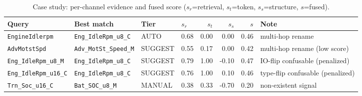 \begin{table}[t]
\caption{Case study: per-channel evidence and fused score ($s_r$=retrieval, $s_t$=token, $s_s$=structure, $s$=fused).}
\label{tab:casestudy}
\centering
\footnotesize
\setlength{\tabcolsep}{3.5pt}
\begin{tabular}{llllrrrl}
\toprule
Query & Best match & Tier & $s_r$ & $s_t$ & $s_s$ & $s$ & Note \\
\midrule
\texttt{EngineIdlerpm} & \texttt{Eng\_IdleRpm\_u8\_C} & AUTO & 0.68 & 0.00 & 0.00 & 0.46 & multi-hop rename \\
\texttt{AdvMotstSpd} & \texttt{Adv\_MotSt\_Speed\_M} & SUGGEST & 0.55 & 0.17 & 0.00 & 0.42 & multi-hop rename (low score) \\
\texttt{Eng\_IdleRpm\_u8\_M} & \texttt{Eng\_IdleRpm\_u8\_C} & SUGGEST & 0.79 & 1.00 & -0.10 & 0.47 & IO-flip confusable (penalized) \\
\texttt{Eng\_IdleRpm\_u16\_C} & \texttt{Eng\_IdleRpm\_u8\_C} & SUGGEST & 0.76 & 1.00 & 0.10 & 0.46 & type-flip confusable (penalized) \\
\texttt{Trn\_Soc\_u16\_C} & \texttt{Bat\_SOC\_u8\_M} & MANUAL & 0.38 & 0.33 & -0.70 & 0.20 & non-existent signal \\
\bottomrule
\end{tabular}
\end{table}
